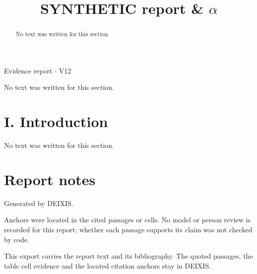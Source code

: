 \documentclass[journal]{IEEEtran}
\begin{document}
\title{SYNTHETIC report \& \ensuremath{\alpha}}

\maketitle

\noindent Evidence report \ensuremath{\cdot} V12

\begin{abstract}

No text was written for this section.

\end{abstract}

\begin{IEEEkeywords}

No text was written for this section.

\end{IEEEkeywords}

\section*{I. Introduction}

No text was written for this section.

\section*{Report notes}

Generated by DEIXIS.

Anchors were located in the cited passages or cells. No model or person review is recorded for this report; whether each passage supports its claim was not checked by code.

This export carries the report text and its bibliography. The quoted passages, the table cell evidence and the located citation anchors stay in DEIXIS.
\end{document}
